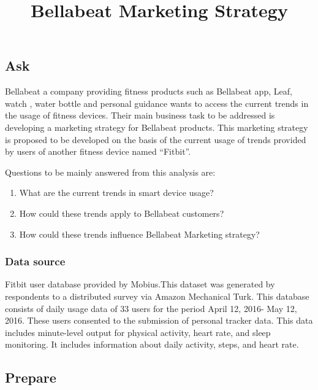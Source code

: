 \documentclass[
]{article}
\title{Bellabeat Marketing Strategy}
\author{}
\date{\vspace{-2.5em}}
\providecommand{\tightlist}{%
  \setlength{\itemsep}{0pt}\setlength{\parskip}{0pt}}
\begin{document}
\maketitle

\hypertarget{ask}{%
\subsection{Ask}\label{ask}}

Bellabeat a company providing fitness products such as Bellabeat app,
Leaf, watch , water bottle and personal guidance wants to access the
current trends in the usage of fitness devices. Their main business task
to be addressed is developing a marketing strategy for Bellabeat
products. This marketing strategy is proposed to be developed on the
basis of the current usage of trends provided by users of another
fitness device named ``Fitbit''.

Questions to be mainly answered from this analysis are:

\begin{enumerate}
\def\labelenumi{\arabic{enumi}.}
\tightlist
\item
  What are the current trends in smart device usage?
\item
  How could these trends apply to Bellabeat customers?
\item
  How could these trends influence Bellabeat Marketing strategy?
\end{enumerate}

\hypertarget{data-source}{%
\subsubsection{Data source}\label{data-source}}

Fitbit user database provided by Mobius.This dataset was generated by
respondents to a distributed survey via Amazon Mechanical Turk. This
database consists of daily usage data of 33 users for the period April
12, 2016- May 12, 2016. These users consented to the submission of
personal tracker data. This data includes minute-level output for
physical activity, heart rate, and sleep monitoring. It includes
information about daily activity, steps, and heart rate.

\hypertarget{prepare}{%
\subsection{Prepare}\label{prepare}}
\end{document}

